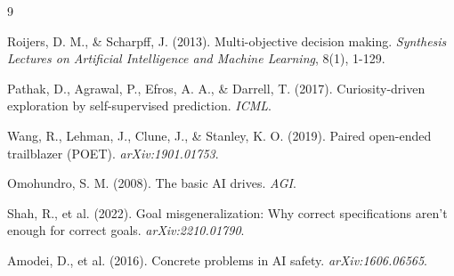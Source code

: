 \documentclass[10pt,a4paper]{article}
\begin{document}

\begin{thebibliography}{9}

Roijers, D. M., \& Scharpff, J. (2013). Multi-objective decision making. \textit{Synthesis Lectures on Artificial Intelligence and Machine Learning}, 8(1), 1-129.

Pathak, D., Agrawal, P., Efros, A. A., \& Darrell, T. (2017). Curiosity-driven exploration by self-supervised prediction. \textit{ICML}.

Wang, R., Lehman, J., Clune, J., \& Stanley, K. O. (2019). Paired open-ended trailblazer (POET). \textit{arXiv:1901.01753}.

Omohundro, S. M. (2008). The basic AI drives. \textit{AGI}.

Shah, R., et al. (2022). Goal misgeneralization: Why correct specifications aren't enough for correct goals. \textit{arXiv:2210.01790}.

Amodei, D., et al. (2016). Concrete problems in AI safety. \textit{arXiv:1606.06565}.

\end{thebibliography}
\end{document}
